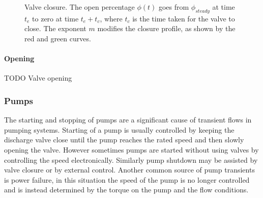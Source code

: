 \documentclass[12pt]{article}
\begin{document}
\begin{figure}
\centering
{} 
\caption{Valve closure. The open percentage $\phi(t)$ goes from $\phi_{steady}$ at time $t_e$ to zero at time $t_e + t_c$, where $t_c$ is the time taken for the valve to close. The exponent $m$ modifies the closure profile, as shown by the red and green curves.}
\label{fig:valve_closing}
\end{figure}

\paragraph{Opening}

{\color{red} TODO Valve opening}

\subsubsection{Pumps}

The starting and stopping of pumps are a significant cause of transient flows in pumping systems. Starting of a pump is usually controlled by keeping the discharge valve close until the pump reaches the rated speed and then slowly opening the valve. However sometimes pumps are started without using valves by controlling the speed electronically. Similarly pump shutdown may be assisted by valve closure or by external control. Another common source of pump transients is power failure, in this situation the speed of the pump is no longer controlled and is instead determined by the torque on the pump and the flow conditions.  
\end{document}
